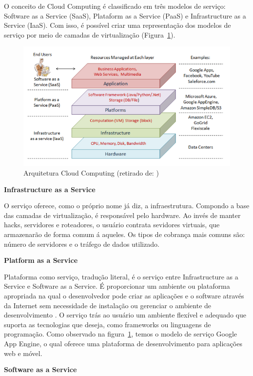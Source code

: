 \documentclass[12pt]{article}
\begin{document}
O conceito de Cloud Computing é classificado em três modelos de serviço: Software as a Service (SaaS), Plataform as a Service (PaaS) e Infrastructure as a Service (IaaS). Com isso, é possível criar uma representação dos modelos de serviço por meio de camadas de virtualização (Figura~\ref{fig:architeture}).

\begin{figure}[ht]
\centering
\includegraphics[width=.9\textwidth]{architeture.png}
\caption{Arquitetura Cloud Computing (retirado de: \cite{2})}
\label{fig:architeture}
\end{figure}

\textbf{Infrastructure as a Service}

O serviço oferece, como o próprio nome já diz, a infraestrutura. Compondo a base das camadas de virtualização, é responsável pelo hardware.
Ao invés de manter hacks, servidores e roteadores, o usuário contrata sevidores virtuais, que armazenarão de forma comum á aqueles. Os tipos de cobrança mais comuns são: número de servidores e o tráfego de dados utilizado.

\textbf{Platform as a Service}

Plataforma como serviço, tradução literal, é o serviço entre Infrastructure as a Service e Software as a Service. É proporcionar um ambiente ou plataforma apropriada na qual o desenvolvedor pode criar as aplicações e o software através da Internet sem necessidade de instalação ou gerenciar o ambiente de desenvolvimento \cite{1}. O serviço trás ao usuário um ambiente flexível e adequado que suporta as tecnologias que deseja, como frameworks ou linguagens de programação. Como observado na figura~\ref{fig:architeture}, temos o modelo de serviço Google App Engine, o qual oferece uma plataforma de desenvolvimento para aplicações web e móvel.

\textbf{Software as a Service}
\end{document}
